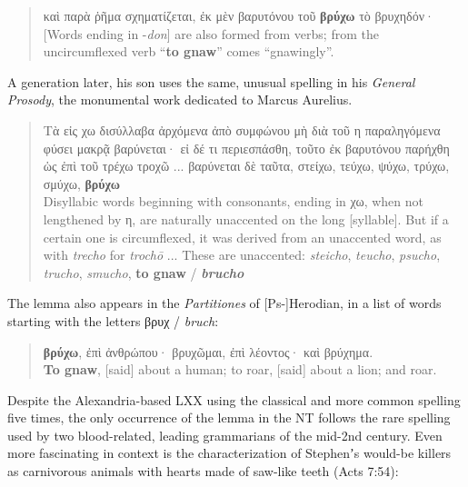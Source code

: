 \vspace*{3mm} 
 \begin{quote}καὶ παρὰ ῥῆμα σχηματίζεται, %
 ἐκ μὲν βαρυτόνου τοῦ \textbf{βρύχω} τὸ βρυχηδόν· \\[1mm] %
 [Words ending in -\textit{don}] are also formed from verbs; %
 from the uncircumflexed verb “\textbf{to gnaw}” comes “gnawingly”. \end{quote} %
 \vspace*{3mm}

A generation later, his son uses the same, unusual spelling in his \textit{General Prosody}, %
the monumental work dedicated to Marcus Aurelius. %

\vspace*{3mm} 
 \begin{quote}Τὰ εἰς χω δισύλλαβα ἀρχόμενα ἀπὸ συμφώνου μὴ διὰ τοῦ η παραληγόμενα φύσει μακρᾷ βαρύνεται· 
 εἰ δέ τι περιεσπάσθη, τοῦτο ἐκ βαρυτόνου παρήχθη ὡς ἐπὶ τοῦ τρέχω τροχῶ ... %
 βαρύνεται δὲ ταῦτα, στείχω, τεύχω, ψύχω, τρύχω, σμύχω, \textbf{βρύχω} \\[1mm] %
 Disyllabic words beginning with consonants, ending in χω, %
 when not lengthened by η, are naturally unaccented on the long [syllable]. %
 But if a certain one is circumflexed, it was derived from an unaccented word, %
 as with \textit{trecho} for \textit{trochō} ... %
 These are unaccented: \textit{steicho}, \textit{teucho}, %
 \textit{psucho}, \textit{trucho}, \textit{smucho}, \textbf{to gnaw} / \textit{\textbf{brucho}} \end{quote} %
 \vspace*{3mm} 

\noindent{}The lemma also appears in the \textit{Partitiones} of [Ps-]Herodian, %
in a list of words starting with the letters βρυχ / \textit{bruch}: %

\vspace*{3mm} 
 \begin{quote}\textbf{βρύχω}, ἐπὶ ἀνθρώπου· βρυχῶμαι, ἐπὶ λέοντος· καὶ βρύχημα. \\[1mm]
 \textbf{To gnaw}, [said] about a human; to roar, [said] about a lion; and roar. %
 \end{quote} %
 \vspace*{3mm}

Despite the Alexandria-based LXX using the classical and more common spelling five times,%
the only occurrence of the lemma in the NT follows the rare spelling %
used by two blood-related, leading grammarians of the mid-2nd century. %
Even more fascinating in context is the characterization of Stephenʼs would-be killers %
as carnivorous animals with hearts made of saw-like teeth (Acts 7:54): %

